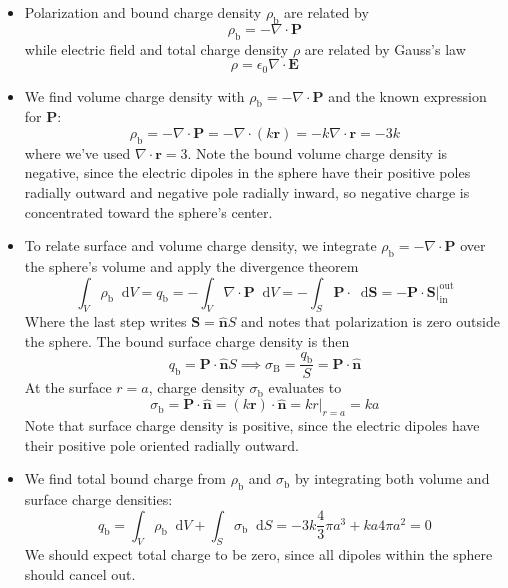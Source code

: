 \documentclass[11pt, a4paper]{article}
\newcommand{\diff}{\mathop{}\!\mathrm{d}} %
\renewcommand{\vec}[1]{\bm{#1}} %
\newcommand{\uvec}[1]{\hat{\vec{#1}}} %
\renewcommand{\r}{\vec{r}}
\newcommand{\E}{\vec{E}}  %
\newcommand{\ee}{\epsilon_{0}}  %
\renewcommand{\P}{\vec{P}}  %
\renewcommand{\div}{\nabla \cdot}
\begin{document}
\begin{itemize}
	\item Polarization and bound charge density $ \rho_{\text{b}} $ are related by
	\begin{equation*}
		\rho_{\text{b}} = - \div \P
	\end{equation*}
	while electric field and total charge density $ \rho $ are related by Gauss's law
	\begin{equation*}
		\rho = \ee \div \E
	\end{equation*}
	
	\item We find volume charge density with $ \rho_{\text{b}} = - \div \P $ and the known expression for $ \P $:
	\begin{equation*}
		\rho_{\text{b}} = - \div \P = - \div (k \r) = -k \div \r = - 3k
	\end{equation*}
	where we've used $ \div \r = 3 $. Note the bound volume charge density is negative, since the electric dipoles in the sphere have their positive poles radially outward and negative pole radially inward, so negative charge is concentrated toward the sphere's center.

	
	\item To relate surface and volume charge density, we integrate $ \rho_{\text{b}} = - \div \P $ over the sphere's volume and apply the divergence theorem
	\begin{equation*}
		\int_{V} \rho_{\text{b}}\diff V = q_{\text{b}} = - \int_{V}\div \P \diff V = - \int_{S}\P \cdot \diff \vec{S} = - \P \cdot \vec{S} \big |_{\text{in}}^{\text{out}}
	\end{equation*}
	Where the last step writes $ \vec{S} = \uvec{n}S $ and notes that polarization is zero outside the sphere. The bound surface charge density is then
	\begin{equation*}
		q_{\text{b}} = \P \cdot \uvec{n} S \implies \sigma_{\text{B}} = \frac{q_{\text{b}}}{S} = \P \cdot \uvec{n}
	\end{equation*}
	At the surface $ r = a $, charge density $ \sigma_{\text{b}} $ evaluates to
	\begin{equation*}
		\sigma_{\text{b}} = \P \cdot \uvec{n} = (k \r) \cdot \uvec{n} = k r \big |_{r = a}  = k a
	\end{equation*}
	Note that surface charge density is positive, since the electric dipoles have their positive pole oriented radially outward. 
	
	\item We find total bound charge from $ \rho_{\text{b}} $ and $ \sigma_{\text{b}} $ by integrating both volume and surface charge densities:
	\begin{equation*}
		q_{\text{b}} = \int_{V} \rho_{\text{b}} \diff V + \int_{S} \sigma_{\text{b}} \diff S = - 3k \frac{4}{3}\pi a^{3} + ka 4\pi a^{2} = 0
	\end{equation*} 
	We should expect total charge to be zero, since all dipoles within the sphere should cancel out.
\end{itemize}	
	
\end{document}
